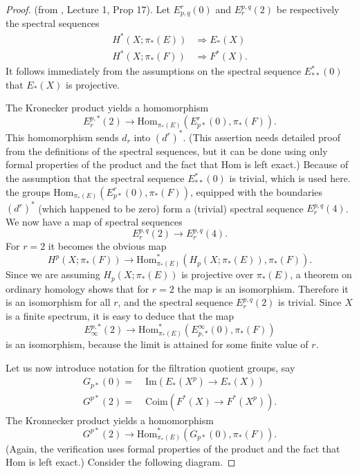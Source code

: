 \documentclass[../main]{subfiles}
\begin{document}
\begin{proof} (from \cite{adams3}, Lecture 1, Prop 17). Let $E^r_{p, q}(0)$ and $E^{p, q}_r(2)$ be respectively the spectral sequences
\begin{align*}H^\ast(X;\pi_\ast(E)) &\Longrightarrow E_\ast(X) \\
H^\ast(X;\pi_\ast(F)) &\Longrightarrow F^\ast(X).
\end{align*}
It follows immediately from the assumptions on the spectral sequence $E^\ast_{\ast \ast}(0)$ that $E_\ast(X)$ is projective.

The Kronecker product yields a homomorphism
\[E_r^{p, \ast}(2) \longrightarrow \text{Hom}_{\pi_\ast(E)}(E^r_{p \ast}(0), \pi_\ast(F)).\]
This homomorphism sends $d_r$ into $\left(d^r\right)^\ast$. (This assertion needs detailed proof from the definitions of the spectral sequences, but it can be done using only formal properties of the product and the fact that Hom is left exact.) Because of the assumption that the spectral sequence $E^\ast_{\ast \ast}(0)$ is trivial, which is used here. the groups $\text{Hom}_{\pi_\ast(E)}(E^r_{p \ast}(0), \pi_\ast(F))$, equipped with the boundaries $\left(d^r\right)^\ast$ (which happened to be zero) form a (trivial) spectral sequence $E^{p, q}_r(4)$. We now have a map of spectral sequences
\[E^{p,q}_r(2) \longrightarrow E^{p,q}_r(4).\]
For $r=2$ it becomes the obvious map
\[H^p(X;\pi_\ast(F)) \longrightarrow \text{Hom}^\ast_{\pi_\ast(E)}(H_p(X;\pi_\ast(E)), \pi_\ast(F)).\]
Since we are assuming $H_p(X;\pi_\ast(E))$ is projective over $\pi_\ast(E)$, a theorem on ordinary homology shows that for $r=2$ the map is an isomorphism. Therefore it is an isomorphism for all $r$, and the spectral sequence $E^{p,q}_r(2)$ is trivial. Since $X$ is a finite spectrum, it is easy to deduce that the map
\[E^{p, \ast}_\infty(2) \longrightarrow \text{Hom}^{\ast}_{\pi_\ast(E)}(E^\infty_{p, \ast}(0), \pi_\ast(F))\]
is an isomorphism, because the limit is attained for some finite value of $r$.

Let us now introduce notation for the filtration quotient groups, say
\begin{align*}
G_{p \ast}(0) =&\; \text{Im}(E_{\ast}(X^p) \longrightarrow E_{\ast}(X)) \\
G^{p \ast}(2) =&\; \text{Coim}(F^{\ast}(X) \longrightarrow F^{\ast}(X^p)).
\end{align*}
The Kronnecker product yields a homomorphism
\[G^{p \ast}(2) \longrightarrow \text{Hom}^{\ast}_{\pi_\ast(E)}(G_{p \ast}(0), \pi_\ast(F)).\]
(Again, the verification uses formal properties of the product and the fact that Hom is left exact.) Consider the following diagram.


\end{proof}
\end{document}
